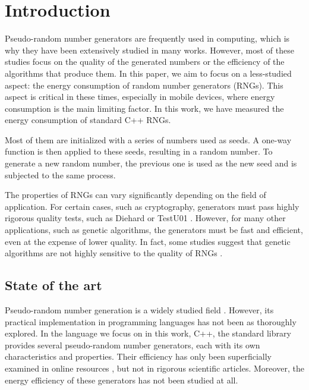 \documentclass[dvipsnames,format=sigconf]{acmart}
\begin{document}

\maketitle

\section{Introduction}
\label{sec:introduction}

Pseudo-random number generators \cite{marsaglia2003random} are frequently used in computing, which is why they have been extensively studied in many works. However, most of these studies focus on the quality of the generated numbers or the efficiency of the algorithms that produce them. In this paper, we aim to focus on a less-studied aspect: the energy consumption of random number generators (RNGs). This aspect is critical in these times, especially in mobile devices, where energy consumption is the main limiting factor. In this work, we have measured the energy consumption of standard C++ RNGs.

Most of them are initialized with a series of numbers used as seeds. A one-way function is then applied to these seeds, resulting in a random number. To generate a new random number, the previous one is used as the new seed and is subjected to the same process.

The properties of RNGs can vary significantly depending on the field of application. For certain cases, such as cryptography, generators must pass highly rigorous quality tests, such as Diehard \cite{marsaglia1997diehard} or TestU01 \cite{testu01}. However, for many other applications, such as genetic algorithms, the generators must be fast and efficient, even at the expense of lower quality. In fact, some studies suggest that genetic algorithms are not highly sensitive to the quality of RNGs \cite{cardenas2011sensitiveness}.

\subsection{State of the art}
\label{sec:state-of-the-art}

Pseudo-random number generation is a widely studied field \cite{marsaglia2003random}. However, its practical implementation in programming languages has not been as thoroughly explored. In the language we focus on in this work, C++, the standard library provides several pseudo-random number generators, each with its own characteristics and properties. Their efficiency has only been superficially examined in online resources \cite{kd9f9-2020,arbelaez-2016}, but not in rigorous scientific articles. Moreover, the energy efficiency of these generators has not been studied at all.
\end{document}
